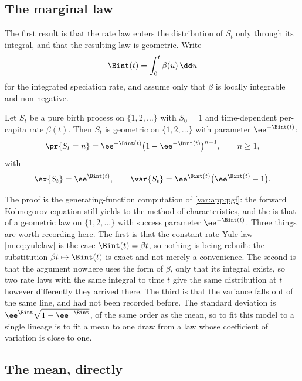 \subsection{The marginal law}
\label{var:sec:marginal}

The first result is that the rate law enters the distribution of $S_t$ only
through its integral, and that the resulting law is geometric. Write
\begin{equation}
\Bint(t)=\int_0^t\beta(u)\,\dd u
\label{var:eq:Bdef}
\end{equation}
for the integrated speciation rate, and assume only that $\beta$ is locally
integrable and non-negative.

\begin{proposition}
\label{var:prop:yule-geom}
Let $S_t$ be a pure birth process on $\{1,2,\dots\}$ with $S_0=1$ and
time-dependent per-capita rate $\beta(t)$. Then $S_t$ is geometric on
$\{1,2,\dots\}$ with parameter $\ee^{-\Bint(t)}$:
\begin{equation}
\pr{S_t=n}=\ee^{-\Bint(t)}\bigl(1-\ee^{-\Bint(t)}\bigr)^{n-1},
\qquad n\ge1,
\label{var:eq:geomlaw}
\end{equation}
with
\[
\ex{S_t}=\ee^{\Bint(t)},
\qquad
\var{S_t}=\ee^{\Bint(t)}\bigl(\ee^{\Bint(t)}-1\bigr).
\]
\end{proposition}

The proof is the generating-function computation of
\cref{var:app:pgf}: the forward Kolmogorov equation still yields to the
method of characteristics, and the \pgf{} is that of a geometric law on
$\{1,2,\dots\}$ with success parameter $\ee^{-\Bint(t)}$. Three things are
worth recording here. The first is that the constant-rate Yule
law \cref{m:eq:yulelaw} is the case $\Bint(t)=\beta t$, so nothing is being
rebuilt: the substitution $\beta t\mapsto\Bint(t)$ is exact and not merely a
convenience. The second is that the argument nowhere uses the form of
$\beta$, only that its integral exists, so two rate laws with the same
integral to time $t$ give the same distribution at $t$ however differently
they arrived there. The third is that the variance falls out of the same
line, and had not been recorded before. The standard deviation is
$\ee^{\Bint}\sqrt{1-\ee^{-\Bint}}$, of the same order as the mean, so to fit
this model to a single lineage is to fit a mean to one draw from a law whose
coefficient of variation is close to one.

\subsection{The mean, directly}
\label{var:sec:mean}


